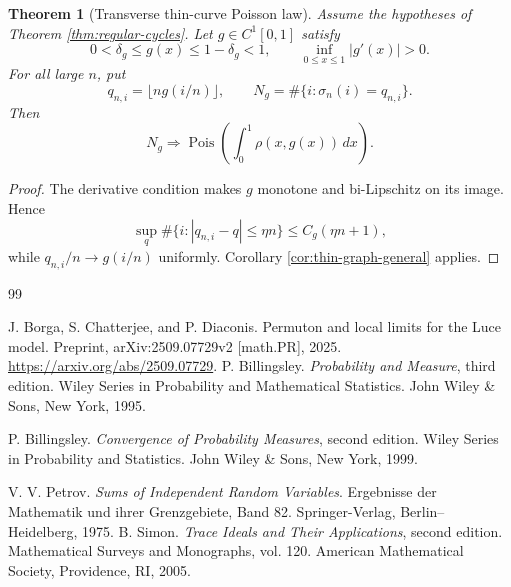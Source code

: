 \documentclass[11pt]{article}
\newtheorem{theorem}{Theorem}[section]
\theoremstyle{remark}
\newcommand{\Pois}{\operatorname{Pois}}
\newcommand{\dd}{\,d}
\begin{document}
\begin{theorem}[Transverse thin-curve Poisson law]\label{thm:thin-curve-transverse}
Assume the hypotheses of Theorem \ref{thm:regular-cycles}.  Let
$g\in C^1[0,1]$ satisfy
\[
        0<\delta_g\le g(x)\le1-\delta_g<1,
        \qquad
        \inf_{0\le x\le1}|g'(x)|>0.
\]
For all large $n$, put
\[
        q_{n,i}=\lfloor ng(i/n)\rfloor,
        \qquad
        N_g=\#\{i:\sigma_n(i)=q_{n,i}\}.
\]
Then
\[
        N_g\Rightarrow
        \Pois\left(\int_0^1\rho(x,g(x))\dd x\right).
\]
\end{theorem}

\begin{proof}
The derivative condition makes $g$ monotone and bi-Lipschitz on its image.
Hence
\[
        \sup_q\#\{i:|q_{n,i}-q|\le\eta n\}
        \le C_g(\eta n+1),
\]
while $q_{n,i}/n\to g(i/n)$ uniformly.  Corollary
\ref{cor:thin-graph-general} applies.
\end{proof}


\begin{thebibliography}{99}

J. Borga, S. Chatterjee, and P. Diaconis.
\newblock Permuton and local limits for the Luce model.
\newblock Preprint, arXiv:2509.07729v2 [math.PR], 2025.
\newblock \url{https://arxiv.org/abs/2509.07729}.
P. Billingsley.
\newblock \emph{Probability and Measure}, third edition.
\newblock Wiley Series in Probability and Mathematical Statistics.
\newblock John Wiley \& Sons, New York, 1995.

P. Billingsley.
\newblock \emph{Convergence of Probability Measures}, second edition.
\newblock Wiley Series in Probability and Statistics.
\newblock John Wiley \& Sons, New York, 1999.

V. V. Petrov.
\newblock \emph{Sums of Independent Random Variables}.
\newblock Ergebnisse der Mathematik und ihrer Grenzgebiete, Band 82.
\newblock Springer-Verlag, Berlin--Heidelberg, 1975.
B. Simon.
\newblock \emph{Trace Ideals and Their Applications}, second edition.
\newblock Mathematical Surveys and Monographs, vol. 120.
\newblock American Mathematical Society, Providence, RI, 2005.

\end{thebibliography}
\end{document}
